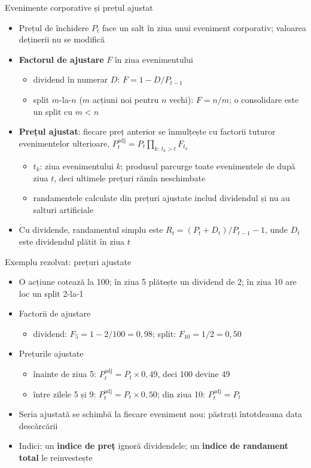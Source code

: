 \begin{frame}{Evenimente corporative și prețul ajustat}
\itemsize{\small}
\begin{itemize}
    \item Prețul de închidere $P_t$ face un salt în ziua unui eveniment corporativ; valoarea deținerii nu se modifică
    \item \textbf{Factorul de ajustare} $F$ în ziua evenimentului
    \begin{itemize}
        \item dividend în numerar $D$: $F = 1 - D/P_{t-1}$
        \item split $m$-la-$n$ ($m$ acțiuni noi pentru $n$ vechi): $F = n/m$; o consolidare este un split cu $m < n$
    \end{itemize}
    \item \textbf{Prețul ajustat}: fiecare preț anterior se înmulțește cu factorii tuturor evenimentelor ulterioare, $P^{\text{adj}}_t = P_t \prod_{k:\, t_k > t} F_{t_k}$
    \begin{itemize}
        \item $t_k$: ziua evenimentului $k$; produsul parcurge toate evenimentele de după ziua $t$, deci ultimele prețuri rămîn neschimbate
        \item randamentele calculate din prețuri ajustate includ dividendul și nu au salturi artificiale
    \end{itemize}
    \item Cu dividende, randamentul simplu este $R_t = (P_t + D_t)/P_{t-1} - 1$, unde $D_t$ este dividendul plătit în ziua $t$ 
\end{itemize}
\end{frame}

\begin{frame}{Exemplu rezolvat: prețuri ajustate}
\itemsize{\small}
\begin{itemize}
    \item O acțiune cotează la 100; în ziua 5 plătește un dividend de 2; în ziua 10 are loc un split 2-la-1
    \item Factorii de ajustare
    \begin{itemize}
        \item dividend: $F_5 = 1 - 2/100 = 0{,}98$; split: $F_{10} = 1/2 = 0{,}50$
    \end{itemize}
    \item Prețurile ajustate
    \begin{itemize}
        \item înainte de ziua 5: $P^{\text{adj}}_t = P_t \times 0{,}49$, deci 100 devine 49
        \item între zilele 5 și 9: $P^{\text{adj}}_t = P_t \times 0{,}50$; din ziua 10: $P^{\text{adj}}_t = P_t$
    \end{itemize}
    \item Seria ajustată se schimbă la fiecare eveniment nou: păstrați întotdeauna data descărcării
    \item Indici: un \textbf{indice de preț} ignoră dividendele; un \textbf{indice de randament total} le reinvestește
\end{itemize}
\end{frame}

